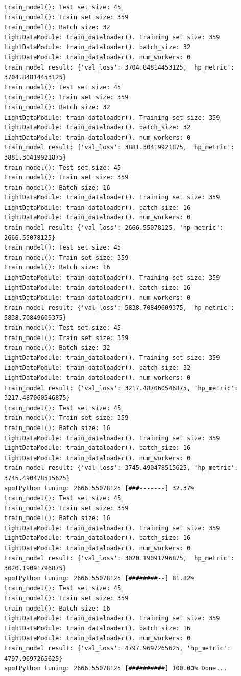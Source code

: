 \documentclass[
  letterpaper,
  DIV=11,
  numbers=noendperiod]{scrreprt}
\begin{document}
\begin{verbatim}
train_model(): Test set size: 45
train_model(): Train set size: 359
train_model(): Batch size: 32
LightDataModule: train_dataloader(). Training set size: 359
LightDataModule: train_dataloader(). batch_size: 32
LightDataModule: train_dataloader(). num_workers: 0
train_model result: {'val_loss': 3704.84814453125, 'hp_metric': 3704.84814453125}
train_model(): Test set size: 45
train_model(): Train set size: 359
train_model(): Batch size: 32
LightDataModule: train_dataloader(). Training set size: 359
LightDataModule: train_dataloader(). batch_size: 32
LightDataModule: train_dataloader(). num_workers: 0
train_model result: {'val_loss': 3881.30419921875, 'hp_metric': 3881.30419921875}
train_model(): Test set size: 45
train_model(): Train set size: 359
train_model(): Batch size: 16
LightDataModule: train_dataloader(). Training set size: 359
LightDataModule: train_dataloader(). batch_size: 16
LightDataModule: train_dataloader(). num_workers: 0
train_model result: {'val_loss': 2666.55078125, 'hp_metric': 2666.55078125}
train_model(): Test set size: 45
train_model(): Train set size: 359
train_model(): Batch size: 16
LightDataModule: train_dataloader(). Training set size: 359
LightDataModule: train_dataloader(). batch_size: 16
LightDataModule: train_dataloader(). num_workers: 0
train_model result: {'val_loss': 5838.70849609375, 'hp_metric': 5838.70849609375}
train_model(): Test set size: 45
train_model(): Train set size: 359
train_model(): Batch size: 32
LightDataModule: train_dataloader(). Training set size: 359
LightDataModule: train_dataloader(). batch_size: 32
LightDataModule: train_dataloader(). num_workers: 0
train_model result: {'val_loss': 3217.487060546875, 'hp_metric': 3217.487060546875}
train_model(): Test set size: 45
train_model(): Train set size: 359
train_model(): Batch size: 16
LightDataModule: train_dataloader(). Training set size: 359
LightDataModule: train_dataloader(). batch_size: 16
LightDataModule: train_dataloader(). num_workers: 0
train_model result: {'val_loss': 3745.490478515625, 'hp_metric': 3745.490478515625}
spotPython tuning: 2666.55078125 [###-------] 32.37% 
train_model(): Test set size: 45
train_model(): Train set size: 359
train_model(): Batch size: 16
LightDataModule: train_dataloader(). Training set size: 359
LightDataModule: train_dataloader(). batch_size: 16
LightDataModule: train_dataloader(). num_workers: 0
train_model result: {'val_loss': 3020.19091796875, 'hp_metric': 3020.19091796875}
spotPython tuning: 2666.55078125 [########--] 81.82% 
train_model(): Test set size: 45
train_model(): Train set size: 359
train_model(): Batch size: 16
LightDataModule: train_dataloader(). Training set size: 359
LightDataModule: train_dataloader(). batch_size: 16
LightDataModule: train_dataloader(). num_workers: 0
train_model result: {'val_loss': 4797.9697265625, 'hp_metric': 4797.9697265625}
spotPython tuning: 2666.55078125 [##########] 100.00% Done...
\end{verbatim}
\end{document}
